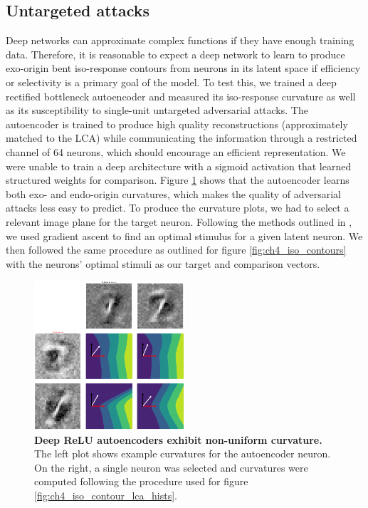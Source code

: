 \subsection{Untargeted attacks}\label{sec:ch4_deep_relu_comparisons}
Deep networks can approximate complex functions if they have enough training data. Therefore, it is reasonable to expect a deep network to learn to produce exo-origin bent iso-response contours from neurons in its latent space if efficiency or selectivity is a primary goal of the model. To test this, we trained a deep rectified bottleneck autoencoder and measured its iso-response curvature as well as its susceptibility to single-unit untargeted adversarial attacks. The autoencoder is trained to produce high quality reconstructions (approximately matched to the LCA) while communicating the information through a restricted channel of 64 neurons, which should encourage an efficient representation. We were unable to train a deep architecture with a sigmoid activation that learned structured weights for comparison. Figure \ref{fig:ch4_drae_curvature} shows that the autoencoder learns both exo- and endo-origin curvatures, which makes the quality of adversarial attacks less easy to predict. To produce the curvature plots, we had to select a relevant image plane for the target neuron. Following the methods outlined in \parencite{mahendran2016visualizing}, we used gradient ascent to find an optimal stimulus for a given latent neuron. We then followed the same procedure as outlined for figure \ref{fig:ch4_iso_contours} with the neurons' optimal stimuli as our target and comparison vectors.

\begin{figure}
    \centering
    \includegraphics[width=0.5\textwidth]{figures/drae_deep_curvature.png}
    \caption{\textbf{Deep ReLU autoencoders exhibit non-uniform curvature.} The left plot shows example curvatures for the autoencoder neuron. On the right, a single neuron was selected and curvatures were computed following the procedure used for figure \ref{fig:ch4_iso_contour_lca_hists}.}
    \label{fig:ch4_drae_curvature}
\end{figure}

